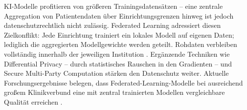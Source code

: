 KI-Modelle profitieren von größeren Trainingsdatensätzen -- eine zentrale Aggregation
von Patientendaten über Einrichtungsgrenzen hinweg ist jedoch datenschutzrechtlich nicht
zulässig. Federated Learning adressiert diesen Zielkonflikt: Jede Einrichtung trainiert
ein lokales Modell auf eigenen Daten; lediglich die aggregierten Modellgewichte werden
geteilt. Rohdaten verbleiben vollständig innerhalb der jeweiligen Institution
\cite{federatedLearning2022}. Ergänzende Techniken wie Differential Privacy -- durch
statistisches Rauschen in den Gradienten -- und Secure Multi-Party Computation stärken
den Datenschutz weiter. Aktuelle Forschungsergebnisse belegen, dass
Federated-Learning-Modelle bei ausreichend großem Klinikverbund eine mit zentral
trainierten Modellen vergleichbare Qualität erreichen \cite{federatedAdvances2025}.
